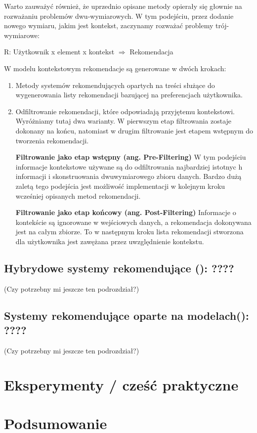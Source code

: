 \documentclass[12pt,a4paper]{report}
\begin{document}
Warto zauważyć również, że uprzednio opisane metody opierały się głownie na rozważaniu problemów dwu-wymiarowych. W tym podejściu, przez dodanie nowego wymiaru, jakim jest kontekst, zaczynamy rozważać problemy trój-wymiarowe:
\begin{center}
R: Użytkownik x element x kontekst $ \Rightarrow$ Rekomendacja
\end{center}
W modelu kontekstowym rekomendacje są generowane w dwóch krokach:
\begin{enumerate}
\item Metody systemów rekomendujących opartych na treści służące do wygenerowania listy rekomendacji bazującej na  preferencjach użytkownika.
\item Odfiltrowanie rekomendacji, które odpowiadają przyjętemu kontekstowi.
Wyróżniamy tutaj dwa warianty. W pierwszym etap filtrowania zostaje dokonany na końcu, natomiast w drugim filtrowanie jest etapem wstępnym do tworzenia rekomendacji.


\textbf{Filtrowanie jako etap wstępny (ang. Pre-Filtering)}
W tym podejściu informacje kontekstowe używane są do odfiltrowania najbardziej istotnyc    h informacji i skonstruowania dwuwymiarowego zbioru danych. Bardzo dużą zaletą tego podejścia jest możliwość implementacji w kolejnym kroku wcześniej opisanych metod rekomendacji. 

 \textbf{Filtrowanie jako etap końcowy (ang. Post-Filtering)}
Informacje o kontekście są ignorowane w wejściowych danych, a rekomendacja dokonywana jest na całym zbiorze. To w następnym kroku lista rekomendacji stworzona dla użytkownika jest zawężana przez uwzględnienie kontekstu.
\end{enumerate}

\section{Hybrydowe systemy rekomendujące (): ????}
(Czy potrzebny mi jeszcze ten podrozdział?)

\section{Systemy rekomendujące oparte na modelach(): ????}
(Czy potrzebny mi jeszcze ten podrozdział?)



\chapter{Eksperymenty / cześć praktyczne}

\chapter{Podsumowanie}



\nocite{*} %


\end{document}
